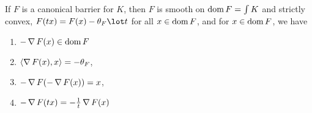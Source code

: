 \begin{thm}
  \label{sec:inter-point-meth-2}
  If $F$ is a canonical barrier for $K$, then $F$ is smooth on $\operatorname*{dom} F
  = \int K$ and strictly convex, $F(tx) = F(x) - \theta_{F} \lot t$
  for all  $x \in \operatorname*{dom} F$, and for $x \in \operatorname*{dom} F$, we have
  \begin{enumerate}
  \item $- \operatorname*{\nabla} F(x) \in \operatorname*{dom} F$
  \item $\IP{\grad F(x), x} = - \theta_{F}$,
  \item $-\operatorname*{\nabla} F(-\operatorname*{\nabla} F(x)) = x$,
  \item $-\operatorname*{\nabla} F(tx) = -\frac{1}{t} \operatorname*{\nabla} F(x) $ 
  \end{enumerate}

\end{thm}



